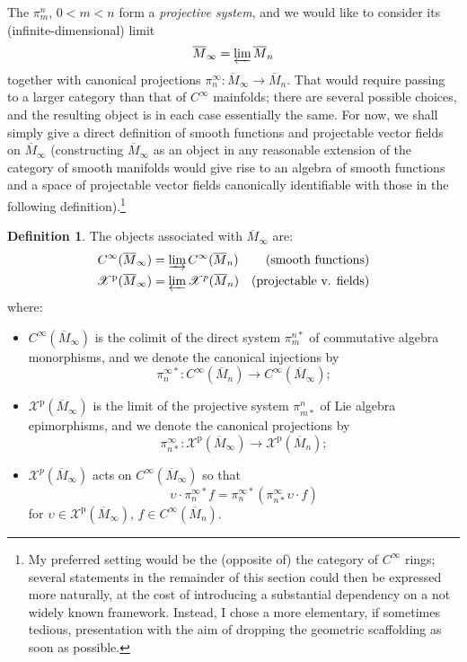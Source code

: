 \documentclass{article}
\def\XX{\mathscr{X}}
\def\p{\mathrm{p}}
\theoremstyle{definition}
\newtheorem{defn}{Definition}
\begin{document}
The $\pi^n_m$, $0 < m < n$ form a \emph{projective system},
and we would like to consider its (infinite-dimensional) limit $$\overline M_\infty = \varprojlim \overline M_n $$
together with
canonical projections $\pi^\infty_n : \overline M_\infty \to \overline M_n$. 
That would require passing to a larger category than that of $C^\infty$ mainfolds;
there are several possible choices, and the resulting object is in each case essentially the
same. 
For now, we shall simply give a direct definition of smooth functions and projectable vector fields
on $\overline M_\infty$
(constructing $\overline M_\infty$ as an object in any reasonable extension of the category of smooth manifolds
would give rise to an algebra of smooth functions and 
a space of projectable vector fields canonically identifiable with those in the following definition).\footnote{
        My preferred setting would be the (opposite of) the category of $C^\infty$ rings;
        several statements in the remainder of this section could then be expressed more naturally,
        at the cost of introducing a substantial dependency on a not widely known framework. Instead,
        I chose a more elementary, if sometimes tedious, presentation with the aim of dropping
        the geometric scaffolding as soon as possible.
}
\begin{defn}
        The objects associated with $\overline M_\infty$ are:
        \begin{align*}
                C^\infty(\overline M_\infty) &= \varinjlim C^\infty(\overline M_n) & \textrm{(smooth functions)} \\
                \XX^\p(\overline M_\infty) &= \varprojlim \XX^p(\overline M_n) & \textrm{(projectable v. fields)}
        \end{align*}
        where:
        \begin{itemize}
\item $C^\infty(\overline M_\infty)$ is the colimit of the direct system  $\pi^{n*}_m$ of 
        commutative algebra monorphisms, and we denote the canonical injections by
        $$\pi^{\infty*}_n : C^\infty(\overline M_n) \to C^\infty(\overline M_\infty);$$
\item $\XX^\p(\overline M_\infty)$ is the limit of the projective system $\pi^n_{m*}$ of
        Lie algebra epimorphisms, and we denote the canonical projections by
        $$ \pi^\infty_{n*}:\XX^\p(\overline M_\infty) \to \XX^\p(\overline M_n);$$
\item $\XX^p(\overline M_\infty)$ acts on $C^\infty(\overline M_\infty)$
        so that $$\upsilon\cdot \pi^{\infty*}_n f = \pi^{\infty*}_n (\pi^\infty_{n*}\upsilon\cdot f)$$
        for $\upsilon \in \XX^\p(\overline M_\infty)$, $f \in C^\infty(\overline M_n)$.
        \end{itemize}
\end{defn}
\end{document}
